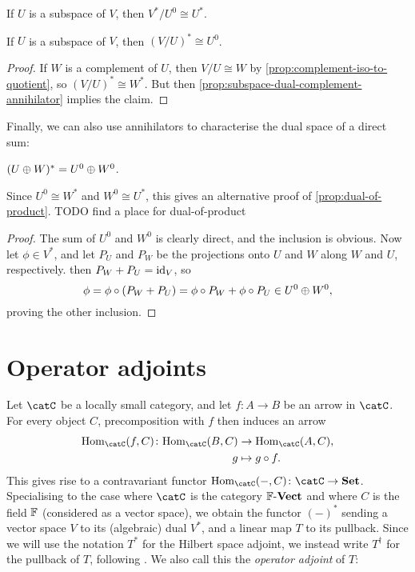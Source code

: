 \begin{propositionnoproof}
    If $U$ is a subspace of $V$, then $V^*/U^0 \cong U^*$.
\end{propositionnoproof}

\begin{corollary}
    If $U$ is a subspace of $V$, then $(V/U)^* \cong U^0$.
\end{corollary}

\begin{proof}
    If $W$ is a complement of $U$, then $V/U \cong W$ by \cref{prop:complement-iso-to-quotient}, so $(V/U)^* \cong W^*$. But then \cref{prop:subspace-dual-complement-annihilator} implies the claim.
\end{proof}


Finally, we can also use annihilators to characterise the dual space of a direct sum:

\begin{proposition}
    $(U \oplus W)^* = U^0 \oplus W^0$.
\end{proposition}
%
Since $U^0 \cong W^*$ and $W^0 \cong U^*$, this gives an alternative proof of \cref{prop:dual-of-product}. TODO find a place for dual-of-product

\begin{proof}
    The sum of $U^0$ and $W^0$ is clearly direct, and the inclusion \textquote{$\supseteq$} is obvious. Now let $\phi \in V^*$, and let $P_U$ and $P_W$ be the projections onto $U$ and $W$ along $W$ and $U$, respectively. then $P_W + P_U = \operatorname{id}_V$, so
    \begin{equation*}
        \phi
            = \phi \circ (P_W + P_U)
            = \phi \circ P_W + \phi \circ P_U
            \in U^0 \dirsum W^0,
    \end{equation*}
    proving the other inclusion.
\end{proof}


\section{Operator adjoints}\label{sec:operator-adjoints}

Let $\catC$ be a locally small category, and let $f \colon A \to B$ be an arrow in $\catC$. For every object $C$, precomposition with $f$ then induces an arrow
%
\begin{align*}
    \hom[\catC](f,C) \colon \hom[\catC](B,C) &\to \hom[\catC](A,C), \\
        g &\mapsto g \circ f.
\end{align*}
%
This gives rise to a contravariant functor $\hom[\catC](-,C) \colon \catC \to \mathbf{Set}$. Specialising to the case where $\catC$ is the category $\mathbb{F}\text{-}\mathbf{Vect}$ and where $C$ is the field $\mathbb{F}$ (considered as a vector space), we obtain the functor $(-)^*$ sending a vector space $V$ to its (algebraic) dual $V^*$, and a linear map $T$ to its pullback. Since we will use the notation $T^*$ for the Hilbert space adjoint, we instead write $T^\dagger$ for the pullback of $T$, following \textcite{follandrealanalysis}. We also call this the \emph{operator adjoint} of $T$:

